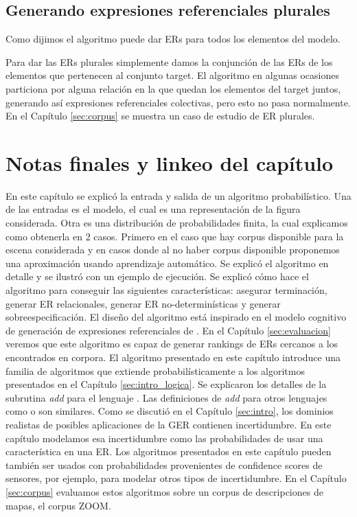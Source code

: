 \subsection{Generando expresiones referenciales plurales}
\label{sec:genera_plural}
Como dijimos el algoritmo puede dar ERs para todos los elementos del modelo. 

Para dar las ERs plurales simplemente damos la conjunci\'on de las ERs de los elementos que pertenecen al conjunto target. El algoritmo en algunas ocasiones particiona por alguna relaci\'on en la que quedan los elementos del target juntos, generando as\'i expresiones referenciales colectivas, pero esto no pasa normalmente. En el Cap\'itulo \ref{sec:corpus} se muestra un caso de estudio de ER plurales.

\section{Notas finales y linkeo del cap\'itulo}
\label{sec:link-algoritmo}

En este cap\'itulo se explic\'o la entrada y salida de un algoritmo probabil\'istico. Una de las entradas es el modelo, el cual es una representaci\'on de la figura considerada. Otra es una distribuci\'on de probabilidades finita, la cual explicamos como obtenerla en 2 casos. Primero en el caso que hay corpus disponible para la escena considerada y en casos donde al no haber corpus disponible proponemos una aproximaci\'on usando aprendizaje autom\'atico. Se explic\'o el algoritmo en detalle y se ilustr\'o con un ejemplo de ejecuci\'on. Se explic\'o c\'omo hace el algoritmo para conseguir las siguientes caracter\'isticas: asegurar terminaci\'on, generar ER relacionales, generar ER no-determin\'isticas y generar sobreespecificaci\'on.
El dise\~no del algoritmo est\'a inspirado en el modelo cognitivo de generaci\'on de expresiones referenciales de \cite{keysar:Curr98}. En el Cap\'itulo \ref{sec:evaluacion} veremos que este algoritmo es capaz de generar rankings de ERs cercanos a los encontrados en corpora.
El algoritmo presentado en este cap\'itulo introduce una familia de algoritmos que extiende probabil\'isticamente a los algoritmos presentados en el Cap\'itulo \ref{sec:intro_logica}. Se explicaron los detalles de la subrutina \textit{add} para el lenguaje \EL. Las definiciones de \textit{add} para otros lenguajes como \ALC o \EPFOL son similares.
Como se discuti\'o en el Cap\'itulo \ref{sec:intro}, los dominios realistas de posibles aplicaciones de la GER contienen incertidumbre. En este cap\'itulo modelamos esa incertidumbre como las probabilidades de usar una caracter\'istica en una ER. 
Los algoritmos presentados en este cap\'itulo pueden tambi\'en ser usados con probabilidades provenientes de confidence scores de sensores, por ejemplo, para modelar otros tipos de incertidumbre.
En el Cap\'itulo \ref{sec:corpus} evaluamos estos algoritmos sobre un corpus de descripciones de mapas, el corpus ZOOM.

